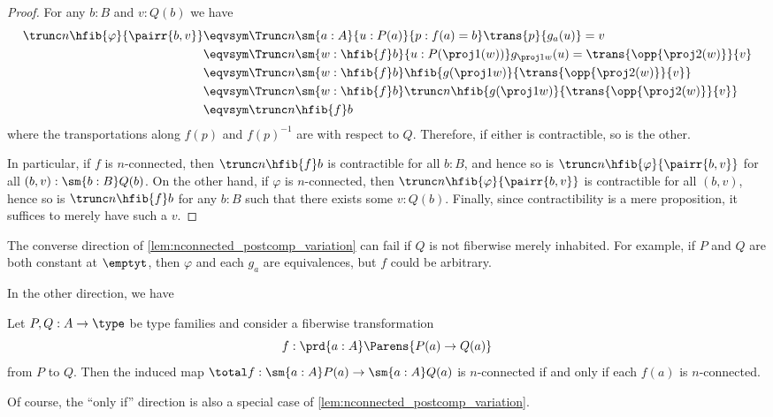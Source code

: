 \begin{proof}
For any $b:B$ and $v:Q(b)$ we have
{\allowdisplaybreaks
\begin{align*}
\trunc n{\hfib{\varphi}{\pairr{b,v}}} & \eqvsym \Trunc n{\sm{a:A}{u:P(a)}{p:f(a)= b} \trans{p}{g_a(u)}= v}\\
& \eqvsym \Trunc n{\sm{w:\hfib{f}b}{u:P(\proj1(w))} g_{\proj 1 w}(u)= \trans{\opp{\proj2(w)}}{v}}\\
& \eqvsym \Trunc n{\sm{w:\hfib{f}b} \hfib{g(\proj1 w)}{\trans{\opp{\proj 2(w)}}{v}}}\\
& \eqvsym \Trunc n{\sm{w:\hfib{f}b} \trunc n{\hfib{g(\proj1 w)}{\trans{\opp{\proj 2(w)}}{v}}}}\\
& \eqvsym \trunc n{\hfib{f}b}
\end{align*}}%
where the transportations along $f(p)$ and $f(p)^{-1}$ are with respect to $Q$.
Therefore, if either is contractible, so is the other.

In particular, if $f$ is $n$-connected, then $\trunc n{\hfib{f}b}$ is contractible for all $b:B$, and hence so is $\trunc n{\hfib{\varphi}{\pairr{b,v}}}$ for all $(b,v):\sm{b:B} Q(b)$.
On the other hand, if $\varphi$ is $n$-connected, then $\trunc n{\hfib{\varphi}{\pairr{b,v}}}$ is contractible for all $(b,v)$, hence so is $\trunc n{\hfib{f}b}$ for any $b:B$ such that there exists some $v:Q(b)$.
Finally, since contractibility is a mere proposition, it suffices to merely have such a $v$.
\end{proof}

The converse direction of \cref{lem:nconnected_postcomp_variation} can fail if $Q$ is not fiberwise merely inhabited.
For example, if $P$ and $Q$ are both constant at $\emptyt$, then $\varphi$ and each $g_a$ are equivalences, but $f$ could be arbitrary.

In the other direction, we have

\begin{lem}\label{prop:nconn_fiber_to_total}
Let $P,Q:A\to\type$ be type families and consider a fiberwise transformation
\begin{equation*}
f:\prd{a:A} \Parens{P(a)\to Q(a)}
\end{equation*}
from $P$ to $Q$. Then the induced map $\total f: \sm{a:A}P(a) \to \sm{a:A} Q(a)$ is $n$-connected if and only if each $f(a)$ is $n$-connected.
\end{lem}

Of course, the ``only if'' direction is also a special case of \cref{lem:nconnected_postcomp_variation}.

